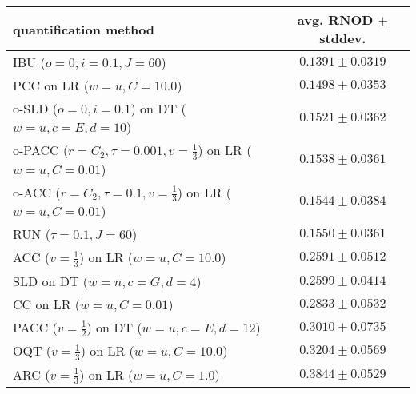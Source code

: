 \begin{tabular}{lc}
  \toprule
  quantification method & avg. RNOD $\pm$ stddev. \\
  \midrule
  IBU ($o=0, i=0.1, J=60$) & $\mathbf{0.1391 \pm 0.0319}$ \\
  PCC on LR ($w=u, C=10.0$) & $0.1498 \pm 0.0353$ \\
  o-SLD ($o=0, i=0.1$) on DT ($w=u, c=E, d=10$) & $0.1521 \pm 0.0362$ \\
  o-PACC ($r=C_2, \tau=0.001, v=\frac{1}{3}$) on LR ($w=u, C=0.01$) & $0.1538 \pm 0.0361$ \\
  o-ACC ($r=C_2, \tau=0.1, v=\frac{1}{3}$) on LR ($w=u, C=0.01$) & $0.1544 \pm 0.0384$ \\
  RUN ($\tau=0.1, J=60$) & $0.1550 \pm 0.0361$ \\
  ACC ($v=\frac{1}{3}$) on LR ($w=u, C=10.0$) & $0.2591 \pm 0.0512$ \\
  SLD on DT ($w=n, c=G, d=4$) & $0.2599 \pm 0.0414$ \\
  CC on LR ($w=u, C=0.01$) & $0.2833 \pm 0.0532$ \\
  PACC ($v=\frac{1}{2}$) on DT ($w=u, c=E, d=12$) & $0.3010 \pm 0.0735$ \\
  OQT ($v=\frac{1}{3}$) on LR ($w=u, C=10.0$) & $0.3204 \pm 0.0569$ \\
  ARC ($v=\frac{1}{3}$) on LR ($w=u, C=1.0$) & $0.3844 \pm 0.0529$ \\
  \bottomrule
\end{tabular}
